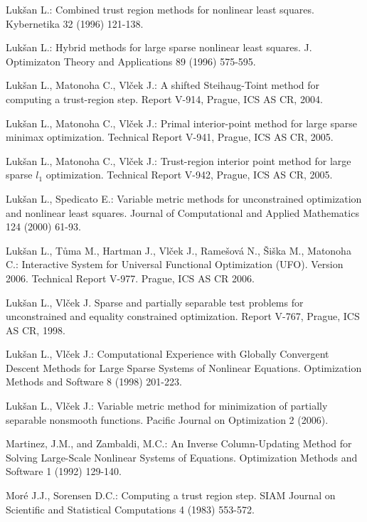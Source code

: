\documentclass{esub2acm}
\begin{document}
\begin{thebibliography}{99}
Luk\v{s}an L.: Combined trust region methods for nonlinear least squares.
Kybernetika 32 (1996) 121-138.

Luk\v{s}an L.: Hybrid methods for large sparse nonlinear least squares.
J. Optimizaton Theory and Applications 89 (1996) 575-595.

Luk\v{s}an L., Matonoha C., Vl\v{c}ek J.: A shifted Steihaug-Toint method
for computing a trust-region step. Report V-914, Prague, ICS AS CR, 2004.

Luk\v{s}an L., Matonoha C., Vl\v{c}ek J.: Primal interior-point
method for large sparse minimax optimization. Technical
Report V-941, Prague, ICS AS CR, 2005.

Luk\v{s}an L., Matonoha C., Vl\v{c}ek J.: Trust-region interior
point method for large sparse $l_1$ optimization. Technical
Report V-942, Prague, ICS AS CR, 2005.

Luk\v{s}an L., Spedicato E.: Variable metric methods for unconstrained
optimization and nonlinear least squares. Journal of Computational and
Applied Mathematics 124 (2000) 61-93.

Luk\v{s}an L., T\r{u}ma M., Hartman J., Vl\v{c}ek J.,
Rame\v{s}ov\'{a} N., \v{S}i\v{s}ka M., Matonoha C.: Interactive
System for Universal Functional Optimization (UFO). Version 2006.
Technical Report V-977. Prague, ICS AS CR 2006.

Luk\v{s}an L., Vl\v{c}ek J. Sparse and partially separable
test problems for unconstrained and equality constrained optimization.
Report V-767, Prague, ICS AS CR, 1998.

Luk\v{s}an L., Vl\v{c}ek J.: Computational Experience with Globally
Convergent Descent Methods for Large Sparse Systems of Nonlinear
Equations. Optimization Methods and Software 8 (1998) 201-223.

Luk\v{s}an L., Vl\v{c}ek J.: Variable metric method for minimization
of partially separable nonsmooth functions. Pacific Journal on
Optimization 2 (2006).

Martinez, J.M., and Zambaldi, M.C.: An Inverse Column-Updating
Method for Solving Large-Scale Nonlinear Systems of Equations.
Optimization Methods and Software 1 (1992) 129-140.

Mor\'{e} J.J., Sorensen D.C.: Computing a trust region step.
SIAM Journal on Scientific and Statistical Computations 4
(1983) 553-572.


\end{thebibliography}
\end{document}
